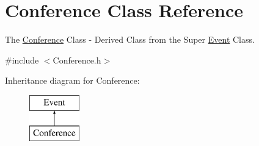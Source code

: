 \hypertarget{classConference}{}\section{Conference Class Reference}
\label{classConference}


The \mbox{\hyperlink{classConference}{Conference}} Class -\/ Derived Class from the Super \mbox{\hyperlink{classEvent}{Event}} Class.  




{\ttfamily \#include $<$Conference.\+h$>$}

Inheritance diagram for Conference\+:\begin{figure}[H]
\begin{center}
\leavevmode
\includegraphics[height=2.000000cm]{classConference}
\end{center}
\end{figure}
